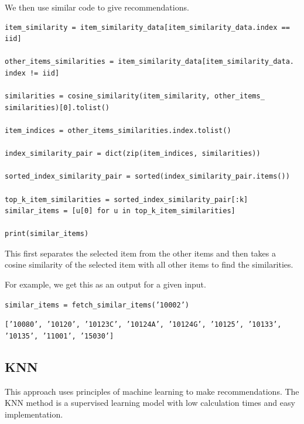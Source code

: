 \documentclass{article}
\begin{document}
We then use similar code to give recommendations.

\begin{lstlisting}
item_similarity = item_similarity_data[item_similarity_data.index == iid]

other_items_similarities = item_similarity_data[item_similarity_data.
index != iid]

similarities = cosine_similarity(item_similarity, other_items_
similarities)[0].tolist()

item_indices = other_items_similarities.index.tolist()

index_similarity_pair = dict(zip(item_indices, similarities))

sorted_index_similarity_pair = sorted(index_similarity_pair.items())

top_k_item_similarities = sorted_index_similarity_pair[:k]
similar_items = [u[0] for u in top_k_item_similarities]

print(similar_items)
\end{lstlisting}

This first separates the selected item from the other items and then takes a cosine similarity of the selected item with all other items to find the similarities.

For example, we get this as an output for a given input.

\begin{center}
    \texttt{similar\_items = fetch\_similar\_items('10002')}

    \texttt{['10080', '10120', '10123C', '10124A', '10124G', '10125', '10133', '10135', '11001', '15030']}
\end{center}

\subsection{KNN}

This approach uses principles of machine learning to make recommendations. The KNN method is a supervised learning model with low calculation times and easy implementation.
\end{document}
